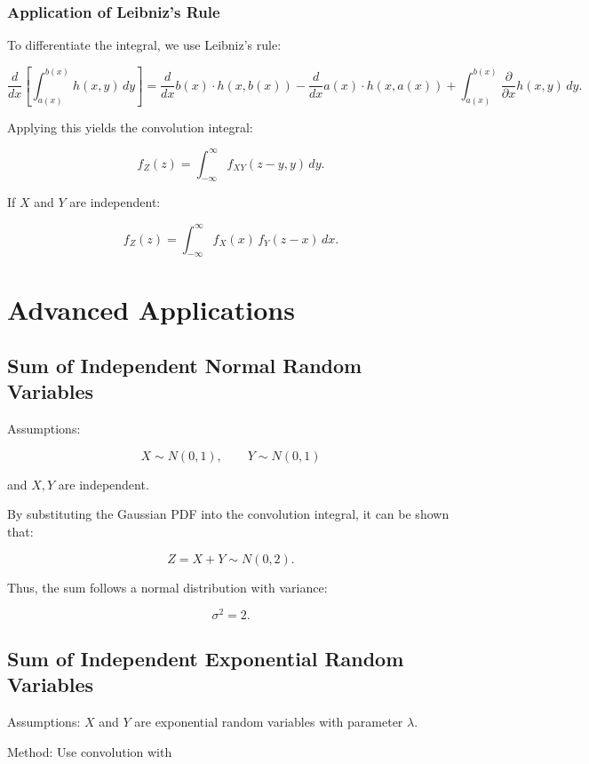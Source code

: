 \documentclass[11pt]{article}
\begin{document}
\subsubsection{Application of Leibniz's Rule}

To differentiate the integral, we use Leibniz's rule:

\[
\frac{d}{dx}\left[\int_{a(x)}^{b(x)} h(x,y)\,dy\right]
=
\frac{d}{dx}b(x)\cdot h(x,b(x))
-
\frac{d}{dx}a(x)\cdot h(x,a(x))
+
\int_{a(x)}^{b(x)}\frac{\partial}{\partial x}h(x,y)\,dy.
\]

Applying this yields the convolution integral:

\[
f_Z(z) = \int_{-\infty}^{\infty} f_{XY}(z-y,y)\,dy.
\]

If $X$ and $Y$ are independent:

\[
f_Z(z) = \int_{-\infty}^{\infty} f_X(x)\,f_Y(z-x)\,dx.
\]


\section{Advanced Applications}

\subsection{Sum of Independent Normal Random Variables}

Assumptions:

\[
X\sim N(0,1), \qquad Y\sim N(0,1)
\]

and $X,Y$ are independent.

By substituting the Gaussian PDF into the convolution integral, it can be shown that:

\[
Z=X+Y\sim N(0,2).
\]

Thus, the sum follows a normal distribution with variance:

\[
\sigma^2 = 2.
\]


\subsection{Sum of Independent Exponential Random Variables}

Assumptions:  
$X$ and $Y$ are exponential random variables with parameter $\lambda$.

Method: Use convolution with
\end{document}
